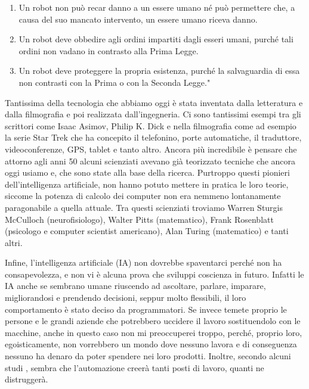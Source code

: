 \documentclass[12pt]{book} %
\begin{document}
\begin{enumerate}
\item Un robot non può recar danno a un essere umano né può permettere che, a causa del suo mancato intervento, un
essere umano riceva danno.
\item Un robot deve obbedire agli ordini impartiti dagli esseri umani, purché tali ordini non vadano in contrasto alla
Prima Legge.
\item Un robot deve proteggere la propria esistenza, purché la salvaguardia di essa non contrasti con la Prima o con la
Seconda Legge."
\end{enumerate}
Tantissima della tecnologia che abbiamo oggi è stata inventata dalla letteratura e dalla filmografia e poi realizzata
dall'ingegneria. Ci sono tantissimi esempi tra gli scrittori come Isaac Asimov, Philip K. Dick e
nella filmografia come ad esempio la serie Star Trek che ha concepito il telefonino, porte automatiche, il traduttore,
videoconferenze, GPS, tablet e tanto altro. Ancora più incredibile è pensare che attorno agli anni 50 alcuni
scienziati avevano già teorizzato tecniche che ancora oggi usiamo e, che sono state alla base della ricerca. Purtroppo
questi pionieri dell'intelligenza artificiale, non hanno potuto mettere in pratica le loro teorie,
siccome la potenza di calcolo dei computer non era nemmeno lontanamente paragonabile a quella attuale. Tra questi
scienziati troviamo Warren Sturgis McCulloch (neurofisiologo), Walter Pitts (matematico), Frank Rosenblatt (psicologo
e computer scientist americano), Alan Turing (matematico) e tanti altri.

Infine, l'intelligenza artificiale (IA) non dovrebbe spaventarci perché non ha consapevolezza, e non vi è alcuna prova che sviluppi coscienza in futuro. Infatti le IA anche se sembrano umane riuscendo ad ascoltare, parlare, imparare, migliorandosi e prendendo
decisioni, seppur molto flessibili, il loro comportamento è stato deciso da programmatori.
Se invece temete proprio le persone e le grandi aziende che potrebbero uccidere il lavoro sostituendolo con le macchine, anche in questo caso non mi preoccuperei troppo, perché, proprio loro, egoisticamente, non vorrebbero un mondo dove nessuno lavora e di conseguenza nessuno ha denaro da poter spendere nei loro prodotti. Inoltre, secondo alcuni studi , sembra che l'automazione creerà tanti posti di lavoro, quanti ne distruggerà.
\end{document}
